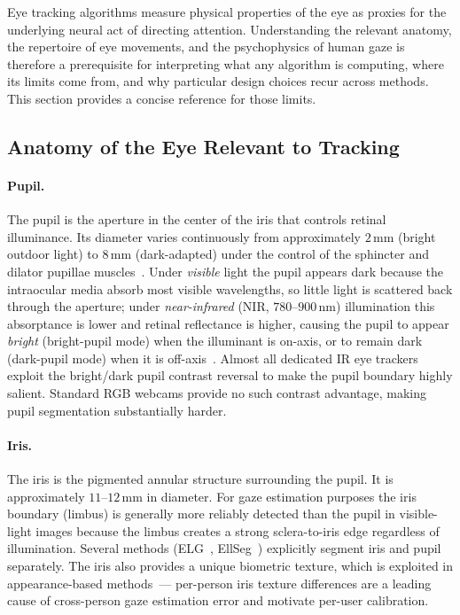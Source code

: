 \documentclass[11pt,a4paper]{article}
\begin{document}
Eye tracking algorithms measure physical properties of the eye as proxies for the underlying neural act of directing attention.
Understanding the relevant anatomy, the repertoire of eye movements, and the psychophysics of human gaze is therefore a prerequisite for interpreting what any algorithm is computing, where its limits come from, and why particular design choices recur across methods.
This section provides a concise reference for those limits.

\subsection{Anatomy of the Eye Relevant to Tracking}

\paragraph{Pupil.}
The pupil is the aperture in the center of the iris that controls retinal illuminance.
Its diameter varies continuously from approximately $2\,\text{mm}$ (bright outdoor light) to $8\,\text{mm}$ (dark-adapted) under the control of the sphincter and dilator pupillae muscles~\cite{winn1994factors}.
Under \textit{visible} light the pupil appears dark because the intraocular media absorb most visible wavelengths, so little light is scattered back through the aperture; under \textit{near-infrared} (NIR, $780$--$900\,\text{nm}$) illumination this absorptance is lower and retinal reflectance is higher, causing the pupil to appear \textit{bright} (bright-pupil mode) when the illuminant is on-axis, or to remain dark (dark-pupil mode) when it is off-axis~\cite{duchowski2007eye}.
Almost all dedicated IR eye trackers exploit the bright/dark pupil contrast reversal to make the pupil boundary highly salient.
Standard RGB webcams provide no such contrast advantage, making pupil segmentation substantially harder.

\paragraph{Iris.}
The iris is the pigmented annular structure surrounding the pupil.
It is approximately $11$--$12\,\text{mm}$ in diameter.
For gaze estimation purposes the iris boundary (limbus) is generally more reliably detected than the pupil in visible-light images because the limbus creates a strong sclera-to-iris edge regardless of illumination.
Several methods (ELG~\cite{park2018learning}, EllSeg~\cite{ellseg2021}) explicitly segment iris and pupil separately.
The iris also provides a unique biometric texture, which is exploited in appearance-based methods~--- per-person iris texture differences are a leading cause of cross-person gaze estimation error and motivate per-user calibration.
\end{document}
